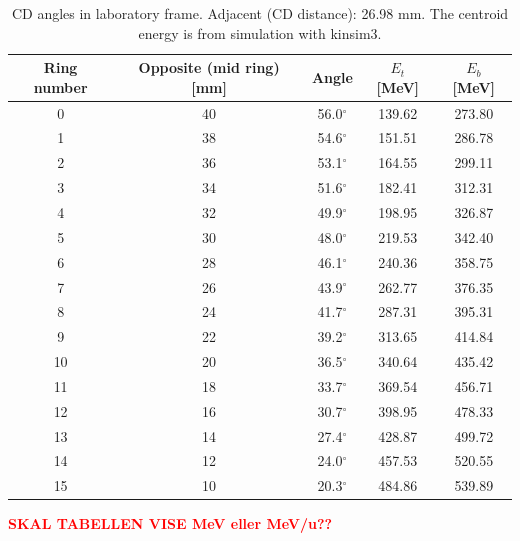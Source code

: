 \documentclass[twoside,english]{uiofysmaster/uiofysmaster}
\begin{document}
\begin{table}[ht] \centering 
\caption{CD angles in laboratory frame. Adjacent (CD distance): 26.98 mm. The centroid energy is from simulation with kinsim3.}
\label{tab:CD_angles}
\begin{tabular}{ccccc}
\hline
Ring number & Opposite (mid ring) [mm] &  Angle         &  $E_t$ [MeV]  &  $E_b$ [MeV]  \\
\hline
0           &  40                      &  56.0$^\circ$  &  139.62       &  273.80  \\
1           &  38                      &  54.6$^\circ$  &  151.51       &  286.78  \\
2           &  36                      &  53.1$^\circ$  &  164.55       &  299.11  \\
3           &  34                      &  51.6$^\circ$  &  182.41       &  312.31  \\
4           &  32                      &  49.9$^\circ$  &  198.95       &  326.87  \\
5           &  30                      &  48.0$^\circ$  &  219.53       &  342.40  \\
6           &  28                      &  46.1$^\circ$  &  240.36       &  358.75  \\
7           &  26                      &  43.9$^\circ$  &  262.77       &  376.35  \\
8           &  24                      &  41.7$^\circ$  &  287.31       &  395.31  \\
9           &  22                      &  39.2$^\circ$  &  313.65       &  414.84  \\
10          &  20                      &  36.5$^\circ$  &  340.64       &  435.42  \\
11          &  18                      &  33.7$^\circ$  &  369.54       &  456.71  \\
12          &  16                      &  30.7$^\circ$  &  398.95       &  478.33  \\
13          &  14                      &  27.4$^\circ$  &  428.87       &  499.72  \\
14          &  12                      &  24.0$^\circ$  &  457.53       &  520.55  \\
15          &  10                      &  20.3$^\circ$  &  484.86       &  539.89  \\
\hline
\end{tabular}
\end{table}

\textcolor{red}{\textbf{SKAL TABELLEN VISE MeV eller MeV/u??}}
\end{document}

